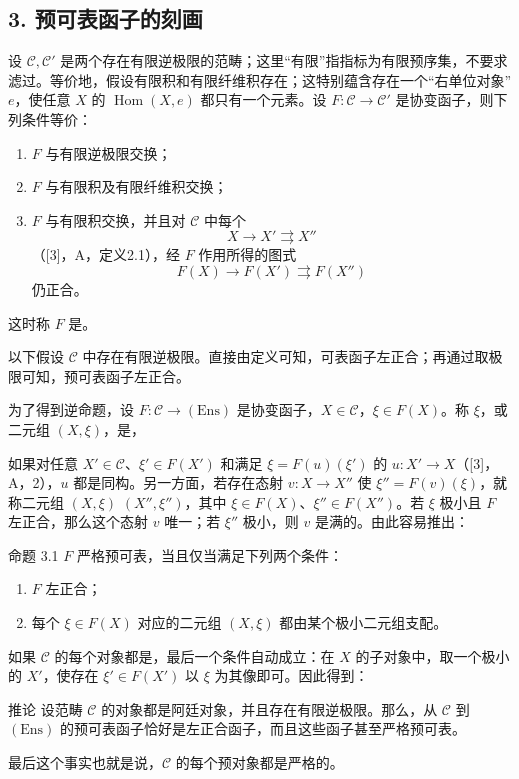 \subsection*{3. 预可表函子的刻画}
设 $\mathcal C,\mathcal C'$ 是两个存在有限逆极限的范畴；这里“有限”指指标为有限预序集，不要求滤过。等价地，假设有限积和有限纤维积存在；这特别蕴含存在一个“右单位对象” $e$，使任意 $X$ 的 $\operatorname{Hom}(X,e)$ 都只有一个元素。设 $F:\mathcal C\to\mathcal C'$ 是协变函子，则下列条件等价：
\begin{enumerate}
\item[(i)] $F$ 与有限逆极限交换；
\item[(ii)] $F$ 与有限积及有限纤维积交换；
\item[(iii)] $F$ 与有限积交换，并且对 $\mathcal C$ 中每个
\[
 X\longrightarrow X'\rightrightarrows X''
\]
（[3]，A，定义2.1），经 $F$ 作用所得的图式
\[
 F(X)\longrightarrow F(X')\rightrightarrows F(X'')
\]
仍正合。
\end{enumerate}
这时称 $F$ 是。

以下假设 $\mathcal C$ 中存在有限逆极限。直接由定义可知，可表函子左正合；再通过取极限可知，预可表函子左正合。

为了得到逆命题，设 $F:\mathcal C\to(\mathrm{Ens})$ 是协变函子，$X\in\mathcal C$，$\xi\in F(X)$。称 $\xi$，或二元组 $(X,\xi)$，是，

如果对任意 $X'\in\mathcal C$、$\xi'\in F(X')$ 和满足 $\xi=F(u)(\xi')$ 的 $u:X'\to X$（[3]，A，2），$u$ 都是同构。另一方面，若存在态射 $v:X\to X''$ 使 $\xi''=F(v)(\xi)$，就称二元组 $(X,\xi)$  $(X'',\xi'')$，其中 $\xi\in F(X)$、$\xi''\in F(X'')$。若 $\xi$ 极小且 $F$ 左正合，那么这个态射 $v$ 唯一；若 $\xi''$ 极小，则 $v$ 是满的。由此容易推出：
\begin{statement}{命题 3.1}
$F$ 严格预可表，当且仅当满足下列两个条件：
\begin{enumerate}
\item[(i)] $F$ 左正合；
\item[(ii)] 每个 $\xi\in F(X)$ 对应的二元组 $(X,\xi)$ 都由某个极小二元组支配。
\end{enumerate}
\end{statement}
如果 $\mathcal C$ 的每个对象都是，最后一个条件自动成立：在 $X$ 的子对象中，取一个极小的 $X'$，使存在 $\xi'\in F(X')$ 以 $\xi$ 为其像即可。因此得到：
\begin{statement}{推论}
设范畴 $\mathcal C$ 的对象都是阿廷对象，并且存在有限逆极限。那么，从 $\mathcal C$ 到 $(\mathrm{Ens})$ 的预可表函子恰好是左正合函子，而且这些函子甚至严格预可表。
\end{statement}
最后这个事实也就是说，$\mathcal C$ 的每个预对象都是严格的。
